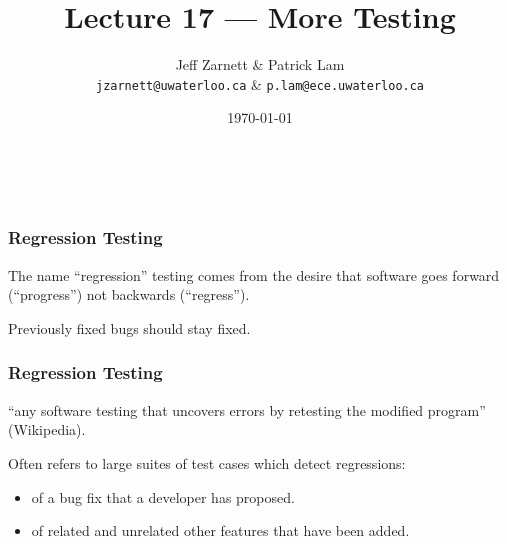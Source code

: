
\usepackage{alltt}

\title{Lecture 17 --- More Testing}

\author{Jeff Zarnett \& Patrick Lam \\ \small \texttt{jzarnett@uwaterloo.ca} \& \texttt{p.lam@ece.uwaterloo.ca}}
\date{\today}



\begin{frame}
  \titlepage

  \vfill
  \begin{center}
    \\
                  {\tiny\CcNote{\CcLongnameByNcSa}}
                  \vspace*{-2.5ex}
  \end{center}

\end{frame}

\begin{frame}
\frametitle{Regression Testing}
\begin{changemargin}{1cm}
The name ``regression'' testing comes from the desire that software goes forward (``progress'') not backwards (``regress'').

Previously fixed bugs should stay fixed.

\end{changemargin}
\end{frame}

\begin{frame}
\frametitle{Regression Testing}

\begin{changemargin}{1cm}
``any software testing that uncovers errors
by retesting the modified program'' (Wikipedia). \\[1em]


Often refers to large
suites of test cases which detect regressions:
\begin{itemize}
\item of a bug fix that a developer has proposed.
\item of related and unrelated other features that have been added.
\end{itemize}
\end{changemargin}
\end{frame}

